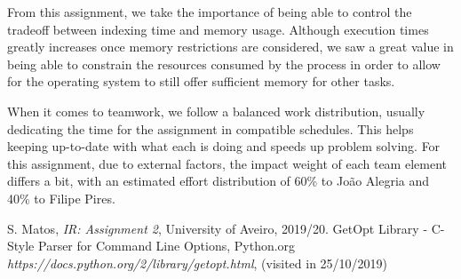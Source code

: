 \documentclass[12pt]{article}
\begin{document}
From this assignment, we take the importance of being able to control the tradeoff 
between indexing time and memory usage.
Although execution times greatly increases once memory restrictions are considered, we
saw a great value in being able to constrain the resources consumed by the process 
in order to allow for the operating system to still offer sufficient memory for other
tasks.

When it comes to teamwork, we follow a balanced work distribution, usually dedicating
the time for the assignment in compatible schedules. This helps keeping up-to-date with 
what each is doing and speeds up problem solving. 
For this assignment, due to external factors, the impact weight of each team element
differs a bit, with an estimated effort distribution of 60\% to João Alegria and 40\%
to Filipe Pires.

\begin{thebibliography}{9}
  

    S. Matos,
    \textit{IR: Assignment 2},
    University of Aveiro,
    2019/20.
    GetOpt Library - C-Style Parser for Command Line Options,
    Python.org
    \textit{https://docs.python.org/2/library/getopt.html},
    (visited in 25/10/2019)
  
\end{thebibliography}

\clearpage
\end{document}
